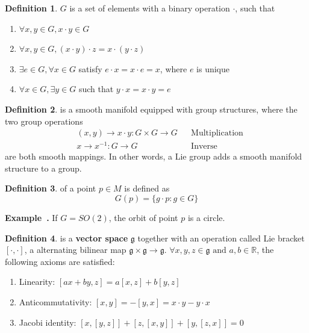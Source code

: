 \documentclass[a4paper]{article}
\theoremstyle{definition}
\newtheorem{definition}{Definition}
\theoremstyle{plain}
\newcounter{example}{Example}
\newenvironment{example}[1][]{\refstepcounter{example}\par\medskip
   \noindent \textbf{Example~\theexample. #1} \rmfamily}{\medskip}
\begin{document}
\begin{definition}
 $G$ is a set of elements with a binary operation $\cdot$, such that
\begin{enumerate}
    \item $\forall x,y\in G, x\cdot y\in G$
    \item $\forall x,y\in G, (x\cdot y)\cdot z=x\cdot( y\cdot z)$
    \item $\exists e\in G, \forall x\in G$ satisfy $e\cdot x=x\cdot e=x$, where $e$ is unique
    \item $\forall x\in G, \exists y\in G$ such that $y\cdot x=x\cdot y=e$
\end{enumerate}
\end{definition}

\begin{definition}
 is a smooth manifold equipped with group structures, where the two group operations
\begin{align*}
    &(x,y)\rightarrow x\cdot y:G\times G\rightarrow G &&\text{Multiplication}\\
    &x\rightarrow x^{-1}:G\rightarrow G  &&\text{Inverse}
\end{align*}
are both smooth mappings. In other words, a Lie group adds a smooth manifold structure to a group.
\end{definition}

\begin{definition}
 of a point $p\in M$ is defined as 
\begin{equation*}
    G(p)=\{g\cdot p:g\in G\}
\end{equation*}
\end{definition}

\begin{example}
If $G=SO(2)$, the orbit of point $p$ is a circle.
\end{example}

\begin{definition}
 is a \textbf{vector space} $\mathfrak{g}$ together with an operation called Lie bracket $[\cdot,\cdot]$, a alternating bilinear map $\mathfrak{g}\times\mathfrak{g}\rightarrow\mathfrak{g}$. $\forall x,y,z\in\mathfrak{g}\text{ and }a,b\in\mathbb{R}$, the following axioms are satisfied:
\begin{enumerate}
    \item Linearity: $[ax+by,z]=a[x,z]+b[y,z]$
    \item Anticommutativity: $[x,y]=-[y,x]=x\cdot y-y\cdot x$
    \item Jacobi identity: $[x,[y,z]]+[z,[x,y]]+[y,[z,x]]=0$
\end{enumerate}
\end{definition} 
\end{document}
